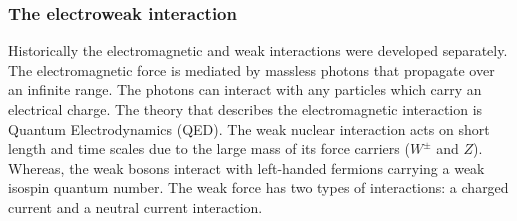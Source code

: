 \subsubsection{The electroweak interaction}\label{sec:electroweak}
Historically the electromagnetic and weak interactions were developed separately. The electromagnetic force is mediated by massless photons that propagate over an infinite range. The photons can interact with any particles which carry an electrical charge. The theory that describes the electromagnetic interaction is Quantum Electrodynamics (QED). The weak nuclear interaction acts on short length and time scales due to the large mass of its force carriers ($W^{\pm}$ and $Z$). Whereas, the weak bosons interact with left-handed fermions carrying a weak isospin quantum number. The weak force has two types of interactions: a charged current and a neutral current interaction. 

